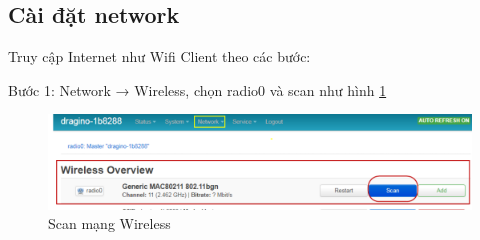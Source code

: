\subsection{Cài đặt network}
Truy cập Internet như Wifi Client theo các bước:
\begin{description}
    \item Bước 1: Network → Wireless, chọn radio0 và scan như hình \ref{fig:radio0_scan}
    \begin{figure}[H]
        \includegraphics[width=\textwidth]{images/Quanh/Radio_scan.png}
        \caption{Scan mạng Wireless}
        \label{fig:radio0_scan}
    \end{figure}
    

\end{description}
